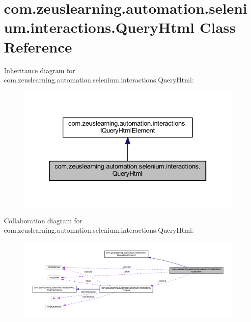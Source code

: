 \hypertarget{classcom_1_1zeuslearning_1_1automation_1_1selenium_1_1interactions_1_1QueryHtml}{}\section{com.\+zeuslearning.\+automation.\+selenium.\+interactions.\+Query\+Html Class Reference}
\label{classcom_1_1zeuslearning_1_1automation_1_1selenium_1_1interactions_1_1QueryHtml}


Inheritance diagram for com.\+zeuslearning.\+automation.\+selenium.\+interactions.\+Query\+Html\+:\nopagebreak
\begin{figure}[H]
\begin{center}
\leavevmode
\includegraphics[width=322pt]{d4/d4b/classcom_1_1zeuslearning_1_1automation_1_1selenium_1_1interactions_1_1QueryHtml__inherit__graph}
\end{center}
\end{figure}


Collaboration diagram for com.\+zeuslearning.\+automation.\+selenium.\+interactions.\+Query\+Html\+:
\nopagebreak
\begin{figure}[H]
\begin{center}
\leavevmode
\includegraphics[width=350pt]{db/dfb/classcom_1_1zeuslearning_1_1automation_1_1selenium_1_1interactions_1_1QueryHtml__coll__graph}
\end{center}
\end{figure}
